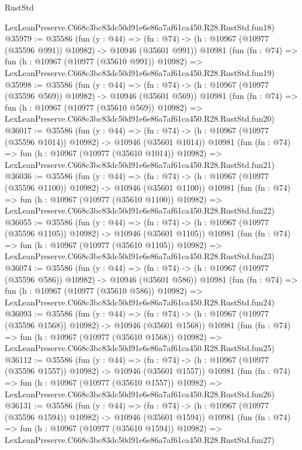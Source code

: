 \begin{lexlean}{RustStd}
\begin{coremodule}
    LexLeanPreserve.C668c3bc83dc50d91e6e86a7af61ca450.R28.RustStd.fun18)
@35979 := @35586
    (fun (y : @44) =>
    (fn : @74) -> (h : @10967 (@10977 (@35596 @991)) @10982) -> @10946 (@35601 @991))
    @10981
    (fun (fn : @74) =>
    fun (h : @10967 (@10977 (@35610 @991)) @10982) =>
    LexLeanPreserve.C668c3bc83dc50d91e6e86a7af61ca450.R28.RustStd.fun19)
@35998 := @35586
    (fun (y : @44) =>
    (fn : @74) -> (h : @10967 (@10977 (@35596 @569)) @10982) -> @10946 (@35601 @569))
    @10981
    (fun (fn : @74) =>
    fun (h : @10967 (@10977 (@35610 @569)) @10982) =>
    LexLeanPreserve.C668c3bc83dc50d91e6e86a7af61ca450.R28.RustStd.fun20)
@36017 := @35586
    (fun (y : @44) =>
    (fn : @74) -> (h : @10967 (@10977 (@35596 @1014)) @10982) -> @10946 (@35601 @1014))
    @10981
    (fun (fn : @74) =>
    fun (h : @10967 (@10977 (@35610 @1014)) @10982) =>
    LexLeanPreserve.C668c3bc83dc50d91e6e86a7af61ca450.R28.RustStd.fun21)
@36036 := @35586
    (fun (y : @44) =>
    (fn : @74) -> (h : @10967 (@10977 (@35596 @1100)) @10982) -> @10946 (@35601 @1100))
    @10981
    (fun (fn : @74) =>
    fun (h : @10967 (@10977 (@35610 @1100)) @10982) =>
    LexLeanPreserve.C668c3bc83dc50d91e6e86a7af61ca450.R28.RustStd.fun22)
@36055 := @35586
    (fun (y : @44) =>
    (fn : @74) -> (h : @10967 (@10977 (@35596 @1105)) @10982) -> @10946 (@35601 @1105))
    @10981
    (fun (fn : @74) =>
    fun (h : @10967 (@10977 (@35610 @1105)) @10982) =>
    LexLeanPreserve.C668c3bc83dc50d91e6e86a7af61ca450.R28.RustStd.fun23)
@36074 := @35586
    (fun (y : @44) =>
    (fn : @74) -> (h : @10967 (@10977 (@35596 @586)) @10982) -> @10946 (@35601 @586))
    @10981
    (fun (fn : @74) =>
    fun (h : @10967 (@10977 (@35610 @586)) @10982) =>
    LexLeanPreserve.C668c3bc83dc50d91e6e86a7af61ca450.R28.RustStd.fun24)
@36093 := @35586
    (fun (y : @44) =>
    (fn : @74) -> (h : @10967 (@10977 (@35596 @1568)) @10982) -> @10946 (@35601 @1568))
    @10981
    (fun (fn : @74) =>
    fun (h : @10967 (@10977 (@35610 @1568)) @10982) =>
    LexLeanPreserve.C668c3bc83dc50d91e6e86a7af61ca450.R28.RustStd.fun25)
@36112 := @35586
    (fun (y : @44) =>
    (fn : @74) -> (h : @10967 (@10977 (@35596 @1557)) @10982) -> @10946 (@35601 @1557))
    @10981
    (fun (fn : @74) =>
    fun (h : @10967 (@10977 (@35610 @1557)) @10982) =>
    LexLeanPreserve.C668c3bc83dc50d91e6e86a7af61ca450.R28.RustStd.fun26)
@36131 := @35586
    (fun (y : @44) =>
    (fn : @74) -> (h : @10967 (@10977 (@35596 @1594)) @10982) -> @10946 (@35601 @1594))
    @10981
    (fun (fn : @74) =>
    fun (h : @10967 (@10977 (@35610 @1594)) @10982) =>
    LexLeanPreserve.C668c3bc83dc50d91e6e86a7af61ca450.R28.RustStd.fun27)

\end{coremodule}
\end{lexlean}

